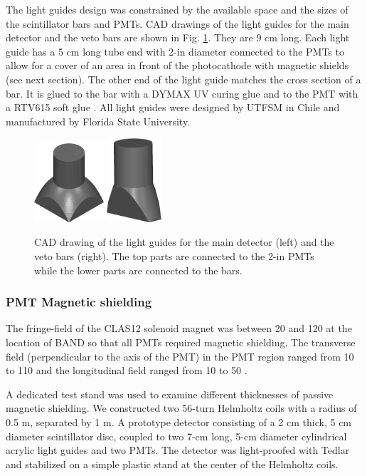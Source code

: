 \documentclass[3p,final,twocolumn]{elsarticle}
\begin{document}
The light guides design was constrained by the available space and the
sizes of the scintillator bars and PMTs. CAD drawings of the light guides for the main detector and the veto bars are shown in Fig. \ref{fig:lightguides}. They are 9 \si{\centi\meter} long. Each light guide has a 5 \si{\centi\meter} long tube end with 2-in diameter connected to the PMTs to allow for a cover of an area in front of the photocathode with magnetic shields (see next section). The other end of the light guide matches the cross section of a bar. It is glued to the bar with a DYMAX UV curing glue \cite{uvglue} and to the PMT with a RTV615 soft glue \cite{softglue}. All light guides were designed by UTFSM in Chile and manufactured by Florida State University.  
\begin{figure}[tb]
	\centering
	\includegraphics[width=0.23\textwidth]{bar_lg.png}
		\includegraphics[width=0.18\textwidth]{veto_lg.png}
	\caption{CAD drawing of the light guides for the main detector (left) and the veto bars (right). The top parts are connected to the 2-in PMTs while the lower parts are connected to the bars.}
	\label{fig:lightguides}
\end{figure}

\subsubsection{PMT Magnetic shielding}
The fringe-field of the CLAS12 solenoid magnet
\cite{Fair:2020yfx} was between 20 and 120 \si{\gauss} at the location of
BAND so that all PMTs required magnetic shielding. The transverse
field (perpendicular to the axis of the PMT) in the PMT region ranged from 10 to
  110 \si{\gauss} and the longitudinal field ranged from 10 to 50 \si{\gauss}.

  A dedicated test stand was used to examine different thicknesses of
  passive magnetic shielding.  We constructed two 56-turn Helmholtz
  coils with a radius of 0.5 \si{\meter}, separated by 1 \si{\meter}. A
  prototype detector consisting of a 2 \si{\centi\meter} thick, 5
  \si{\centi\meter} diameter scintillator disc, coupled to two
  7-\si{\centi\meter} long, 5-\si{\centi\meter} diameter cylindrical
  acrylic light guides and two PMTs. The detector was
  light-proofed with Tedlar and stabilized on a simple plastic stand
  at the center of the Helmholtz coils.
\end{document}
